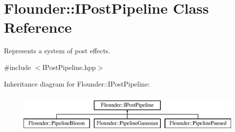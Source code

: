 \hypertarget{class_flounder_1_1_i_post_pipeline}{}\section{Flounder\+:\+:I\+Post\+Pipeline Class Reference}
\label{class_flounder_1_1_i_post_pipeline}


Represents a system of post effects.  




{\ttfamily \#include $<$I\+Post\+Pipeline.\+hpp$>$}

Inheritance diagram for Flounder\+:\+:I\+Post\+Pipeline\+:\begin{figure}[H]
\begin{center}
\leavevmode
\includegraphics[height=2.000000cm]{class_flounder_1_1_i_post_pipeline}
\end{center}
\end{figure}
